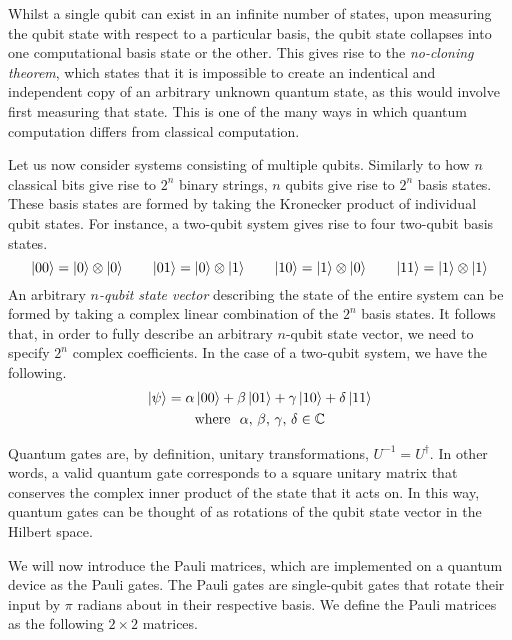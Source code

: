 Whilst a single qubit can exist in an infinite number of states, upon measuring the qubit state with respect to a particular basis, the qubit state collapses into one computational basis state or the other. This gives rise to the \textit{no-cloning theorem}, which states that it is impossible to create an indentical and independent copy of an arbitrary unknown quantum state, as this would involve first measuring that state. This is one of the many ways in which quantum computation differs from classical computation.

Let us now consider systems consisting of multiple qubits. Similarly to how $n$ classical bits give rise to $2^n$ binary strings, $n$ qubits give rise to $2^n$ basis states. These basis states are formed by taking the Kronecker product of individual qubit states. For instance, a two-qubit system gives rise to four two-qubit basis states.
\begin{equation*}
    \ket{00} = \ket 0 \otimes \ket 0 \qquad
    \ket{01} = \ket 0 \otimes \ket 1 \qquad
    \ket{10} = \ket 1 \otimes \ket 0 \qquad
    \ket{11} = \ket 1 \otimes \ket 1
\end{equation*}
An arbitrary \textit{$n$-qubit state vector} describing the state of the entire system can be formed by taking a complex linear combination of the $2^n$ basis states. It follows that, in order to fully describe an arbitrary $n$-qubit state vector, we need to specify $2^n$ complex coefficients. In the case of a two-qubit system, we have the following.
\begin{gather*}
    \ket\psi =
    \alpha \ket{00} +
    \beta \ket{01} +
    \gamma \ket{10} +
    \delta \ket{11} \\
    \text{where} \,\,\,\, \alpha, \, \beta, \, \gamma, \, \delta \in \mathbb{C}
\end{gather*}


Quantum gates are, by definition, unitary transformations, $U^{-1} = U^\dagger$. In other words, a valid quantum gate corresponds to a square unitary matrix that conserves the complex inner product of the state that it acts on. In this way, quantum gates can be thought of as rotations of the qubit state vector in the Hilbert space.

We will now introduce the Pauli matrices, which are implemented on a quantum device as the Pauli gates. The Pauli gates are single-qubit gates that rotate their input by $\pi$ radians about in their respective basis. We define the Pauli matrices as the following $2 \times 2$ matrices.

